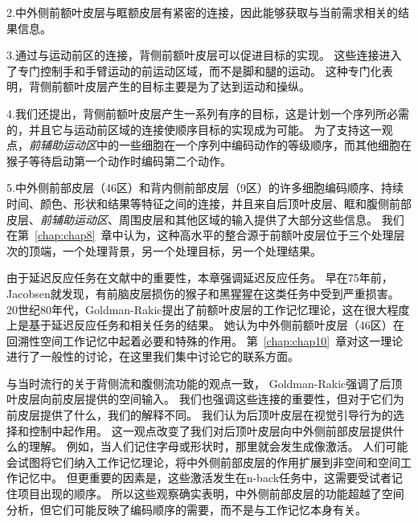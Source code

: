 2.中外侧前额叶皮层与眶额皮层有紧密的连接\cite{barbas1989architecture}，因此能够获取与当前需求相关的结果信息。
\par


3.通过与运动前区的连接，背侧前额叶皮层可以促进目标的实现。
这些连接进入了专门控制手和手臂运动的前运动区域，而不是脚和腿的运动。
这种专门化表明，背侧前额叶皮层产生的目标主要是为了达到运动和操纵。
\par


4.我们还提出，背侧前额叶皮层产生一系列有序的目标，这是计划一个序列所必需的，并且它与运动前区域的连接使顺序目标的实现成为可能。
为了支持这一观点，\textit{前辅助运动区}中的一些细胞在一个序列中编码动作的等级顺序\cite{shima2000neuronal}，而其他细胞在猴子等待启动第一个动作时编码第二个动作\cite{nakajima2009covert}。
\par


5.中外侧前部皮层（46区）和背内侧前部皮层（9区）的许多细胞编码顺序、持续时间、颜色、形状和结果等特征之间的连接，并且来自后顶叶皮层、眶和腹侧前部皮层、\textit{前辅助运动区}、周围皮层和其他区域的输入提供了大部分这些信息。
我们在第~\ref{chap:chap8}~章中认为，这种高水平的整合源于前额叶皮层位于三个处理层次的顶端，一个处理背景，另一个处理目标，另一个处理结果。


由于延迟反应任务在文献中的重要性，本章强调延迟反应任务。
早在75年前，Jacobsen就发现，有前脑皮层损伤的猴子和黑猩猩\cite{jacobsen1935functions}在这类任务中受到严重损害。
20世纪80年代，Goldman-Rakic\cite{ps1987circuitry}提出了前额叶皮层的工作记忆理论，这在很大程度上是基于延迟反应任务和相关任务的结果。
她认为中外侧前额叶皮层（46区）在回溯性空间工作记忆中起着必要和特殊的作用\cite{goldman1996prefrontal}。
第~\ref{chap:chap10}~章对这一理论进行了一般性的讨论，在这里我们集中讨论它的联系方面。


与当时流行的关于背侧流和腹侧流功能的观点一致\cite{ungerleider1982two}， Goldman-Rakic强调了后顶叶皮层向前皮层提供的空间输入\cite{wilson1993dissociation}。
我们也强调这些连接的重要性，但对于它们为前皮层提供了什么，我们的解释不同。
我们认为后顶叶皮层在视觉引导行为的选择和控制中起作用\cite{shadmehr2004computational,milner2006visual}。
这一观点改变了我们对后顶叶皮层向中外侧前部皮层提供什么的理解\cite{rushworth2000anatomical}。
例如，当人们记住字母或形状时，那里就会发生成像激活\cite{rushworth1998functional}。
人们可能会试图将它们纳入工作记忆理论，将中外侧前部皮层的作用扩展到非空间和空间工作记忆中。
但更重要的因素是，这些激活发生在n-back任务中，这需要受试者记住项目出现的顺序\cite{nystrom2000working}。
所以这些观察确实表明，中外侧前部皮层的功能超越了空间分析，但它们可能反映了编码顺序的需要，而不是与工作记忆本身有关。



